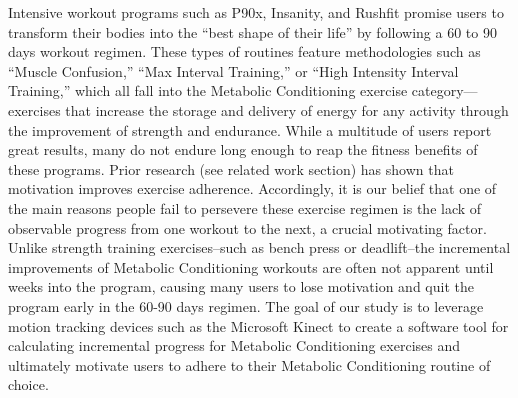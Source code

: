 Intensive workout programs such as P90x, Insanity, and Rushfit promise users to transform their bodies into the “best shape of their life” by following a 60 to 90 days workout regimen.  These types of routines feature methodologies such as “Muscle Confusion,” “Max Interval Training,” or “High Intensity Interval Training,” which all fall into the Metabolic Conditioning exercise category---exercises that increase the storage and delivery of energy for any activity through the improvement of strength and endurance.  While a multitude of users report great results, many do not endure long enough to reap the fitness benefits of these programs. Prior research (see related work section) has shown that motivation improves exercise adherence. Accordingly, it is our belief that one of the main reasons people fail to persevere these exercise regimen is the lack of observable progress from one workout to the next, a crucial motivating factor. Unlike strength training exercises--such as bench press or deadlift--the incremental improvements of Metabolic Conditioning workouts are often not apparent until weeks into the program, causing many users to lose motivation and quit the program early in the 60-90 days regimen. The goal of our study is to leverage motion tracking devices such as the Microsoft Kinect to create a software tool for calculating incremental progress for Metabolic Conditioning exercises and ultimately motivate users to adhere to their Metabolic Conditioning routine of choice.\\